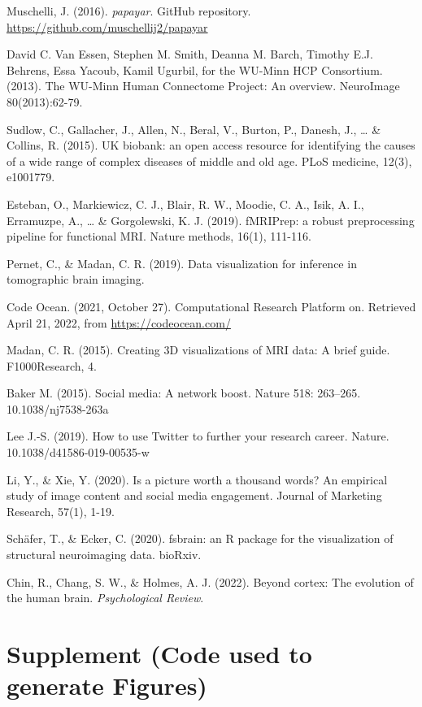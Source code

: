 \documentclass{article}
\begin{document}
Muschelli, J. (2016). \emph{papayar}. GitHub repository. \url{https://github.com/muschellij2/papayar}

David C. Van Essen, Stephen M. Smith, Deanna M. Barch, Timothy E.J. Behrens, Essa Yacoub, Kamil Ugurbil, for the WU-Minn HCP Consortium. (2013). The WU-Minn Human Connectome Project: An overview. NeuroImage 80(2013):62-79.

Sudlow, C., Gallacher, J., Allen, N., Beral, V., Burton, P., Danesh, J., \ldots{} \& Collins, R. (2015). UK biobank: an open access resource for identifying the causes of a wide range of complex diseases of middle and old age. PLoS medicine, 12(3), e1001779.

Esteban, O., Markiewicz, C. J., Blair, R. W., Moodie, C. A., Isik, A. I., Erramuzpe, A., \ldots{} \& Gorgolewski, K. J. (2019). fMRIPrep: a robust preprocessing pipeline for functional MRI. Nature methods, 16(1), 111-116.

Pernet, C., \& Madan, C. R. (2019). Data visualization for inference in tomographic brain imaging.

Code Ocean. (2021, October 27). Computational Research Platform on. Retrieved April 21, 2022, from \url{https://codeocean.com/}

Madan, C. R. (2015). Creating 3D visualizations of MRI data: A brief guide. F1000Research, 4.

Baker M. (2015). Social media: A network boost. Nature 518: 263--265. 10.1038/nj7538-263a

Lee J.-S. (2019). How to use Twitter to further your research career. Nature. 10.1038/d41586-019-00535-w

Li, Y., \& Xie, Y. (2020). Is a picture worth a thousand words? An empirical study of image content and social media engagement. Journal of Marketing Research, 57(1), 1-19.

Schäfer, T., \& Ecker, C. (2020). fsbrain: an R package for the visualization of structural neuroimaging data. bioRxiv.

Chin, R., Chang, S. W., \& Holmes, A. J. (2022). Beyond cortex: The evolution of the human brain. \emph{Psychological Review}.

\newpage

\hypertarget{supplement-code-used-to-generate-figures}{%
\section{Supplement (Code used to generate Figures)}\label{supplement-code-used-to-generate-figures}}
\end{document}
